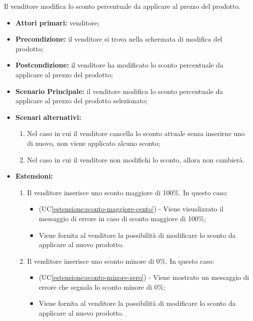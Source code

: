 Il venditore modifica lo sconto percentuale da applicare al prezzo del prodotto.
\begin{itemize}
    \item \textbf{Attori primari:} venditore;
    \item \textbf{Precondizione:} il venditore si trova nella schermata di modifica del prodotto;
    \item \textbf{Postcondizione:} il venditore ha modificato lo sconto percentuale da applicare al prezzo del prodotto;
    \item \textbf{Scenario Principale:} il venditore modifica lo sconto percentuale da applicare al prezzo del prodotto selezionato;
    \item \textbf{Scenari alternativi:}
    \begin{enumerate}[label=\lett]
    	\item Nel caso in cui il venditore cancella lo sconto attuale senza inserirne uno di nuovo, non viene applicato alcuno sconto;
    	\item Nel caso in cui il venditore non modifichi lo sconto, allora non cambierà.
    \end{enumerate}
    \item \textbf{Estensioni:}
    \begin{enumerate}[label=\lett]
    	\item Il venditore inserisce uno sconto maggiore di 100\%. In questo caso:
		\begin{itemize}
			\item (UC\ref{estensione:sconto-maggiore-cento}) - Viene visualizzato il messaggio di errore in caso di sconto maggiore di 100\%;
			\item Viene fornita al venditore la possibilità di modificare lo sconto da applicare al nuovo prodotto.
		\end{itemize}
		\item Il venditore inserisce uno sconto minore di 0\%. In questo caso:
		\begin{itemize}
			\item (UC\ref{estensione:sconto-minore-zero}) - Viene mostrato un messaggio di errore che segnala lo sconto minore di 0\%;
			\item Viene fornita al venditore la possibilità di modificare lo sconto da applicare al nuovo prodotto.
		\end{itemize}
    \end{enumerate}
\end{itemize}

